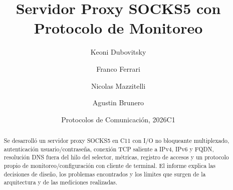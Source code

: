 \documentclass[11pt,a4paper]{article}
\title{Servidor Proxy SOCKS5 con Protocolo de Monitoreo}
\author{Keoni Dubovitsky \and Franco Ferrari \and Nicolas Mazzitelli \and Agustin Brunero}
\date{Protocolos de Comunicación, 2026C1}
\begin{document}
\maketitle

\begin{abstract}
Se desarrolló un servidor proxy SOCKS5 en C11 con I/O no bloqueante multiplexado,
autenticación usuario/contraseña, conexión TCP saliente a IPv4, IPv6 y FQDN,
resolución DNS fuera del hilo del selector, métricas, registro de accesos y un
protocolo propio de monitoreo/configuración con cliente de terminal. El informe
explica las decisiones de diseño, los problemas encontrados y los límites que
surgen de la arquitectura y de las mediciones realizadas.
\end{abstract}

\tableofcontents
\clearpage











\end{document}
